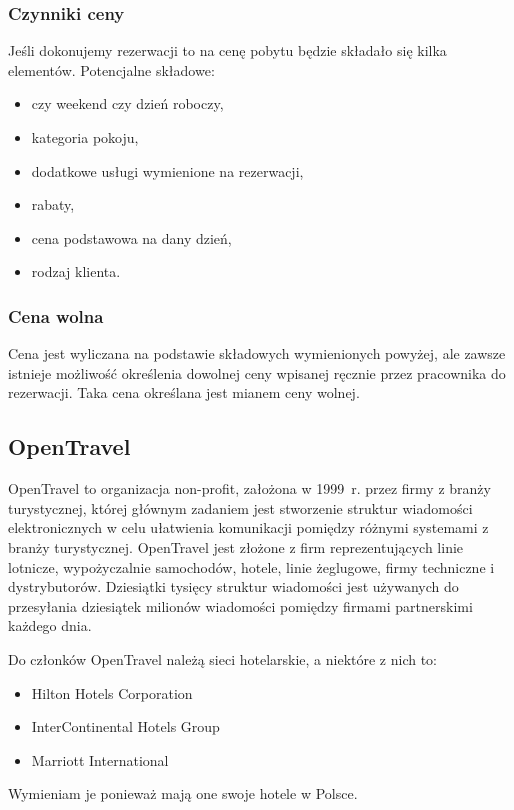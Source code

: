 \documentclass[a4paper,onecolumn,oneside,11pt,wide,floatssmall]{mwrep}
\theoremstyle{definition}
\theoremstyle{plain}%
\theoremstyle{remark}
\begin{document}
\subsubsection{Czynniki ceny}
Jeśli dokonujemy rezerwacji to na cenę pobytu będzie składało się kilka
elementów. Potencjalne składowe:
\begin{itemize}
  \item czy weekend czy dzień roboczy,
  \item kategoria pokoju,
  \item dodatkowe usługi wymienione na rezerwacji,
  \item rabaty,
  \item cena podstawowa na dany dzień,
  \item rodzaj klienta.
\end{itemize}

\subsubsection{Cena wolna}
Cena jest wyliczana na podstawie składowych wymienionych powyżej, ale zawsze
istnieje możliwość określenia dowolnej ceny wpisanej ręcznie przez pracownika
do rezerwacji.
Taka cena określana jest mianem ceny wolnej.

\subsection{OpenTravel}
OpenTravel to organizacja non-profit, założona w \mbox{1999 r.} przez firmy
z branży turystycznej, której głównym zadaniem jest stworzenie struktur
wiadomości elektronicznych w celu ułatwienia komunikacji pomiędzy różnymi systemami z
branży turystycznej. OpenTravel jest złożone z firm reprezentujących linie
lotnicze, wypożyczalnie samochodów, hotele, linie żeglugowe, firmy techniczne i
dystrybutorów. Dziesiątki tysięcy struktur wiadomości jest używanych do
przesyłania dziesiątek milionów wiadomości pomiędzy firmami partnerskimi każdego
dnia.

Do członków OpenTravel należą sieci hotelarskie, a niektóre z nich to:
\begin{itemize}
  \item Hilton Hotels Corporation
  \item InterContinental Hotels Group
  \item Marriott International
\end{itemize}

Wymieniam je ponieważ mają one swoje hotele w Polsce. 
\end{document}

